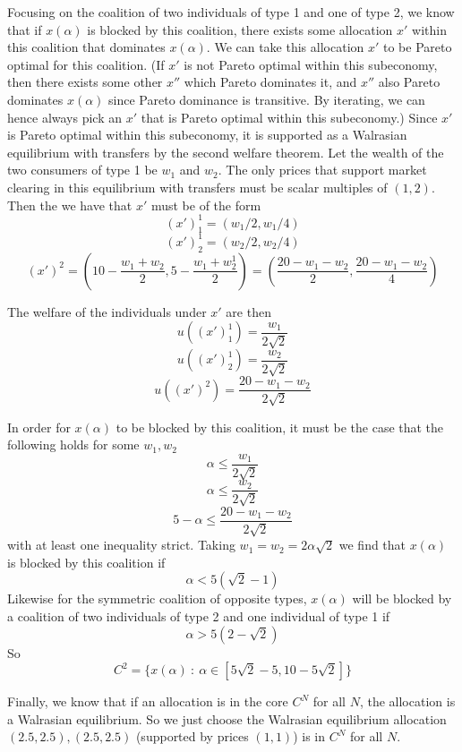 \documentclass[10pt,letter]{article}
\begin{document}
Focusing on the coalition of two individuals of type 1 and one of type 2, we know that if $x(\alpha)$ is blocked by this coalition, there exists some allocation $x'$ within this coalition that dominates $x(\alpha)$. We can take this allocation $x'$ to be Pareto optimal for this coalition. (If $x'$ is not Pareto optimal within this subeconomy, then there exists some other $x''$ which Pareto dominates it, and $x''$ also Pareto dominates $x(\alpha)$ since Pareto dominance is transitive. By iterating, we can hence always pick an $x'$ that is Pareto optimal within this subeconomy.) Since $x'$ is Pareto optimal within this subeconomy, it is supported as a Walrasian equilibrium with transfers by the second welfare theorem. Let the wealth of the two consumers of type 1 be $w_1$ and $w_2$. The only prices that support market clearing in this equilibrium with transfers must be scalar multiples of $(1,2)$. Then the we have that $x'$ must be of the form
\[ (x')^1_1 = (w_1/2, w_1/4)\]
\[ (x')^1_2 = (w_2/2, w_2/4)\]
\[ (x')^2 = \left(10 - \frac{w_1+w_2}{2}, 5 - \frac{w_1+w^1_2}{2}\right) = \left(\frac{20 - w_1 -w_2}{2}, \frac{20 - w_1 - w_2}{4} \right) \]

The welfare of the individuals under $x'$ are then
\[ u((x')^1_1) = \frac{w_1}{2\sqrt{2}} \]
\[ u((x')^1_2) = \frac{w_2}{2\sqrt{2}} \]
\[ u((x')^2) = \frac{20 - w_1 - w_2}{2\sqrt{2}} \]

In order for $x(\alpha)$ to be blocked by this coalition, it must be the case that the following holds for some $w_1, w_2$
\[ \alpha \le \frac{w_1}{2\sqrt{2}} \]
\[ \alpha \le \frac{w_2}{2\sqrt{2}} \]
\[ 5 - \alpha \le \frac{20 - w_1 - w_2}{2\sqrt{2}} \]
with at least one inequality strict. Taking $w_1 = w_2 = 2\alpha \sqrt{2}$
we find that $x(\alpha)$ is blocked by this coalition if
\[ \alpha < 5(\sqrt{2} - 1) \]
Likewise for the symmetric coalition of opposite types, $x(\alpha)$ will be blocked by a coalition of two individuals of type 2 and one individual of type 1 if
\[ \alpha > 5 (2 - \sqrt{2}) \]
So
\[ C^2 = \{ x(\alpha) \ : \ \alpha \in [5\sqrt{2} - 5, 10 - 5\sqrt{2}]  \}  \]

Finally, we know that if an allocation is in the core $C^N$ for all $N$, the allocation is a Walrasian equilibrium. So we just choose the Walrasian equilibrium allocation $(2.5, 2.5), (2.5, 2.5)$ (supported by prices $(1,1)$) is in $C^N$ for all $N$.
\end{document}
